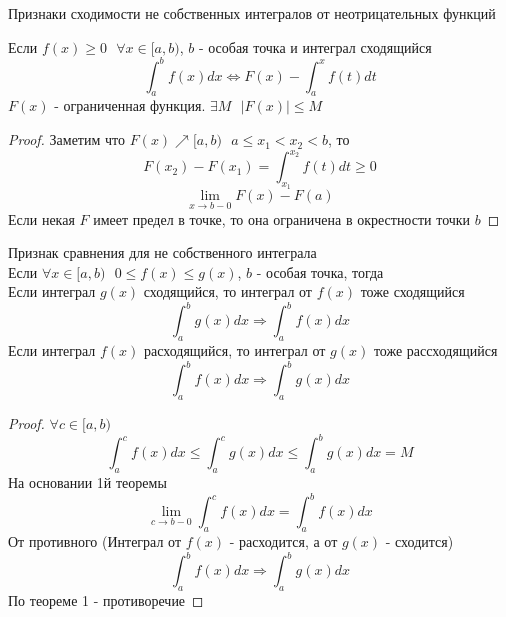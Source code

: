 \begin{title}[\Large]
  Признаки сходимости не собственных интегралов от неотрицательных функций
\end{title}

\begin{theorem}[1]
  Если $f(x) \ge 0 ~~~ \forall x \in [a, b)$, $b$ - особая точка и интеграл
  сходящийся
  \[
    \int^{b}_{a} f(x)dx \Leftrightarrow F(x) - \int^{x}_{a} f(t)dt
  \]
  $F(x)$ - ограниченная функция. $\exists M ~~~ |F(x)| \le M$
\end{theorem}

\begin{proof}
  Заметим что $F(x) \nearrow [a, b) ~~~ a \le x_1 < x_2 < b$, то
  \[
    F(x_2) - F(x_1) = \int^{x_2}_{x_1} f(t)dt \ge 0
  \]
  \[
    \lim_{x \to b - 0} F(x) - F(a)
  \]
  Если некая $F$ имеет предел в точке, то она ограничена в окрестности точки $b$
\end{proof}

\begin{theorem}[2]
  Признак сравнения для не собственного интеграла\\
  Если $\forall x \in [a, b) ~~~ 0 \le f(x) \le g(x)$, $b$ - особая точка,
  тогда\\
   Если интеграл $g(x)$ сходящийся, то интеграл от $f(x)$ тоже сходящийся
  \[\int^{b}_{a} g(x)dx \Rightarrow \int^{b}_{a} f(x)dx\]
   Если интеграл $f(x)$ расходящийся, то интеграл от $g(x)$ тоже
  рассходящийся
  \[\int^{b}_{a} f(x)dx \Rightarrow \int^{b}_{a} g(x)dx\]
\end{theorem}

\begin{proof}
  $\forall c \in [a, b)$
  \[
    \int^{c}_{a} f(x)dx \le \int^{c}_{a} g(x)dx \le \int^{b}_{a} g(x)dx = M
  \]
  На основании 1й теоремы
  \[
    \lim_{c \to b - 0} \int^{c}_{a} f(x)dx = \int^{b}_{a} f(x)dx
  \]
   От противного (Интеграл от $f(x)$ - расходится, а от $g(x)$ -
  сходится)
  \[
    \int^{b}_{a} f(x)dx \Rightarrow \int^{b}_{a} g(x)dx
  \]
  По теореме 1 - противоречие
\end{proof}